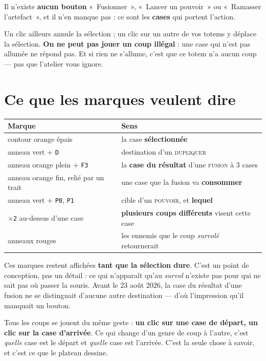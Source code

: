 Il n'existe \textbf{aucun bouton} «~Fusionner~», «~Lancer un pouvoir~» ou
«~Ramasser l'artefact~», et il n'en manque pas : ce sont les \textbf{cases} qui
portent l'action.

Un clic ailleurs annule la sélection ; un clic sur un autre de vos totems y
déplace la sélection. \textbf{On ne peut pas jouer un coup illégal} : une case
qui n'est pas allumée ne répond pas. Et si rien ne s'allume, c'est que ce totem
n'a aucun coup --- pas que l'atelier vous ignore.

\section{Ce que les marques veulent dire}

\begin{center}
\begin{tabular}{@{}p{5.2cm}p{8.6cm}@{}}
\toprule
\textbf{Marque} & \textbf{Sens} \\
\midrule
contour orange épais & la case \textbf{sélectionnée} \\
anneau vert $+$ \texttt{D} & destination d'un \textsc{dupliquer} \\
anneau orange plein $+$ \texttt{F3} & la \textbf{case du résultat} d'une \textsc{fusion} à 3 cases \\
anneau orange fin, relié par un trait & une case que la fusion va \textbf{consommer} \\
anneau vert $+$ \texttt{P0}, \texttt{P1} & cible d'un \textsc{pouvoir}, et \textbf{lequel} \\
\texttt{$\times$2} au-dessus d'une case & \textbf{plusieurs coups différents} visent cette case \\
anneaux rouges & les ennemis que le coup \emph{survolé} retournerait \\
\bottomrule
\end{tabular}
\end{center}

Ces marques restent affichées \textbf{tant que la sélection dure}. C'est un point
de conception, pas un détail : ce qui n'apparaît qu'au \emph{survol} n'existe pas
pour qui ne sait pas où passer la souris. Avant le 23 août 2026, la case du
résultat d'une fusion ne se distinguait d'aucune autre destination --- d'où
l'impression qu'il manquait un bouton.


Tous les coups se jouent du même geste : \textbf{un clic sur une case de départ,
un clic sur la case d'arrivée}. Ce qui change d'un genre de coup à l'autre,
c'est \emph{quelle} case est le départ et \emph{quelle} case est l'arrivée.
C'est la seule chose à savoir, et c'est ce que le plateau dessine.

